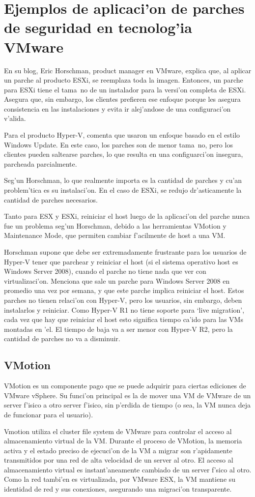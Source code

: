 \section{Ejemplos de aplicaci'on de parches de seguridad en tecnolog'ia VMware}

En su blog, Eric Horschman, product manager en VMware, explica que, al aplicar un parche al producto ESXi, se reemplaza toda la imagen. Entonces, un parche para ESXi tiene el tama~no de un instalador para la versi'on completa de ESXi. Asegura que, sin embargo, los clientes prefieren ese enfoque porque les asegura consistencia en las instalaciones y evita ir alej'andose de una configuraci'on v'alida.

Para el producto Hyper-V, comenta que usaron un enfoque basado en el estilo Windows Update. En este caso, los parches son de menor tama~no, pero los clientes pueden saltearse parches, lo que resulta en una configuarci'on insegura, parcheada parcialmente.

Seg'un Horschman, lo que realmente importa es la cantidad de parches y cu'an problem'tica es su instalaci'on. En el caso de ESXi, se redujo dr'asticamente la cantidad de parches necesarios.

Tanto para ESX y ESXi, reiniciar el host luego de la aplicaci'on del parche nunca fue un problema seg'un Horschman, debido a las herramientas VMotion y Maintenance Mode, que permiten cambiar f'acilmente de host a una VM.

Horschman supone que debe ser extremadamente frustrante para los usuarios de Hyper-V tener que parchear y reiniciar el host (si el sistema operativo host es Windows Server 2008), cuando el parche no tiene nada que ver con virtualizaci'on. Menciona que sale un parche para Windows Server 2008 en promedio una vez por semana, y que este parche implica reiniciar el host. Estos parches no tienen relaci'on con Hyper-V, pero los usuarios, sin embargo, deben instalarlos y reiniciar. Como Hyper-V R1 no tiene soporte para `live migration', cada vez que hay que reiniciar el host esto significa tiempo ca'ido para las VMs montadas en 'el. El tiempo de baja va a ser menor con Hyper-V R2, pero la cantidad de parches no va a disminuir.

\subsection{VMotion}

VMotion es un componente pago que se puede adquirir para ciertas ediciones de VMware vSphere. Su funci'on principal es la de mover una VM de VMware de un server f'isico a otro server f'isico, sin p'erdida de tiempo (o sea, la VM nunca deja de funcionar para el usuario).


Vmotion utiliza el cluster file system de VMware para controlar el acceso al almacenamiento virtual de la VM. Durante el proceso de VMotion, la memoria activa y el estado preciso de ejecuci'on de la VM a migrar son r'apidamente transmitidos por una red de alta velocidad de un server al otro. El acceso al almacenamiento virtual es instant'aneamente cambiado de un server f'sico al otro. Como la red tambi'en es virtualizada, por VMware ESX, la VM mantiene su identidad de red y sus conexiones, asegurando una migraci'on transparente.